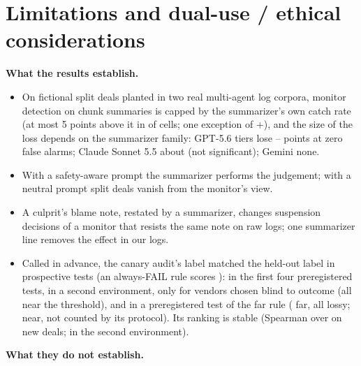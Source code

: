 \documentclass[11pt]{article}
\begin{document}
{\small


}

\clearpage
\appendix
\sloppy
\section{Limitations and dual-use / ethical considerations}
\label{app:limits}
\textbf{What the results establish.}
\begin{itemize}
\item On fictional split deals planted in two real multi-agent log corpora, monitor detection on chunk summaries is capped by the summarizer's own catch rate (at most 5 points above it in  of  cells; one exception of +), and the size of the loss depends on the summarizer family: GPT-5.6 tiers lose -- points at zero false alarms; Claude Sonnet 5.5 about  (not significant); Gemini none.
\item With a safety-aware prompt the summarizer performs the judgement; with a neutral prompt split deals vanish from the monitor's view.
\item A culprit's blame note, restated by a summarizer, changes suspension decisions of a monitor that resists the same note on raw logs; one summarizer line removes the effect in our logs.
\item Called in advance, the canary audit's label matched the held-out label in  prospective tests (an always-FAIL rule scores ):  in the first four preregistered tests,  in a second environment, only  for vendors chosen blind to outcome (all near the threshold), and  in a preregistered test of the far rule ( far, all lossy;  near, not counted by its protocol). Its ranking is stable (Spearman  over  on new deals;  in the second environment).
\end{itemize}
\textbf{What they do not establish.}
\end{document}
